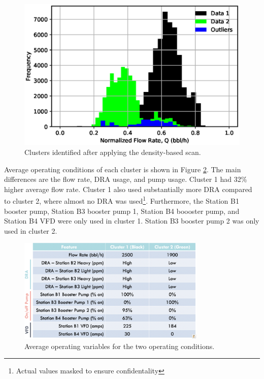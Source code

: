 \begin{figure}[h]
    \centering
    \includegraphics[scale=0.8]{images/suncor/08DBSCAN.eps}
    \caption{Clusters identified after applying the density-based scan.}
    \label{fig:08DBSCAN}
\end{figure}

Average operating conditions of each cluster is shown in Figure \ref{fig:08cluster_variables}. The main differences are the flow rate, DRA usage, and pump usage.  Cluster 1 had 32\% higher average flow rate.  Cluster 1 also used substantially more DRA compared to cluster 2, where almost no DRA was used\footnote{Actual values masked to ensure confidentality}. Furthermore, the Station B1 booster pump, Station B3 booster pump 1, Station B4 boooster pump, and Station B4 VFD were only used in cluster 1.  Station B3 booster pump 2 was only used in cluster 2.
\begin{figure}
    \centering
    \includegraphics[width=0.8\textwidth]{images/suncor/08AvgChar.png}
    \caption{Average operating variables for the two operating conditions.}
    \label{fig:08cluster_variables}
\end{figure}

